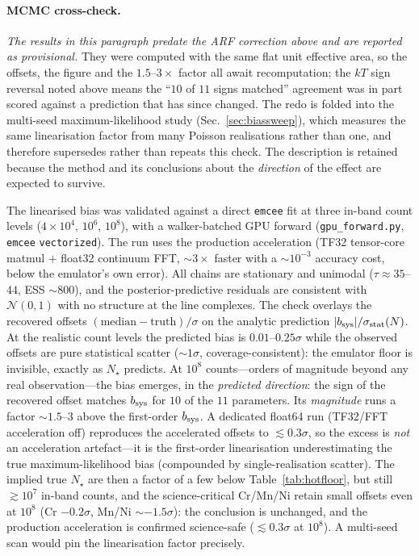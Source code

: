 \documentclass[11pt,a4paper]{article}
\newcommand{\code}[1]{\texttt{#1}}
\begin{document}
\paragraph{MCMC cross-check.} \emph{The results in this paragraph predate the
ARF correction above and are reported as provisional.} They were computed with
the same flat unit effective area, so the offsets, the figure and the
$1.5$--$3\times$ factor all await recomputation; the $kT$ sign reversal noted
above means the ``$10$ of $11$ signs matched'' agreement was in part scored
against a prediction that has since changed. The redo is folded into the
multi-seed maximum-likelihood study (Sec.~\ref{sec:biassweep}), which measures
the same linearisation factor from many Poisson realisations rather than one,
and therefore supersedes rather than repeats this check. The description is
retained because the method and its conclusions about the \emph{direction} of
the effect are expected to survive.

The linearised bias was validated against a direct
\code{emcee} fit at three in-band count levels ($4\times10^4$, $10^6$, $10^8$),
with a walker-batched GPU forward (\code{gpu\_forward.py}, \code{emcee}
\code{vectorized}). The run uses the production acceleration (TF32 tensor-core
matmul $+$ float32 continuum FFT, ${\sim}3\times$ faster with a ${\sim}10^{-3}$
accuracy cost, below the emulator's own error). All chains are stationary and
unimodal ($\tau\!\approx\!35$--$44$, ESS ${\sim}800$), and the
posterior-predictive residuals are consistent with $\mathcal N(0,1)$ with no
structure at the line complexes. The check overlays the recovered
offsets $(\mathrm{median}-\mathrm{truth})/\sigma$ on the analytic prediction
$|b_{\rm sys}|/\sigma_{\rm stat}(N)$. At the realistic count levels the predicted
bias is $0.01$--$0.25\sigma$ while the observed offsets are pure statistical
scatter (${\sim}1\sigma$, coverage-consistent): the emulator floor is invisible,
exactly as $N_\star$ predicts. At $10^8$ counts---orders of magnitude beyond any
real observation---the bias emerges, in the \emph{predicted direction}: the sign
of the recovered offset matches $b_{\rm sys}$ for $10$ of the $11$ parameters. Its
\emph{magnitude} runs a factor ${\sim}1.5$--$3$ above the first-order
$b_{\rm sys}$. A dedicated float64 run (TF32/FFT acceleration off) reproduces the
accelerated offsets to ${\lesssim}0.3\sigma$, so the excess is \emph{not} an
acceleration artefact---it is the
first-order linearisation underestimating the true maximum-likelihood bias
(compounded by single-realisation scatter). The implied true $N_\star$ are then a
factor of a few below Table~\ref{tab:hotfloor}, but still ${\gtrsim}10^7$ in-band
counts, and the science-critical Cr/Mn/Ni retain small offsets even at $10^8$
(Cr $-0.2\sigma$, Mn/Ni ${\sim}-1.5\sigma$): the conclusion is unchanged, and the
production acceleration is confirmed science-safe (${\lesssim}0.3\sigma$ at
$10^8$). A multi-seed scan would pin the linearisation factor precisely.
\end{document}
